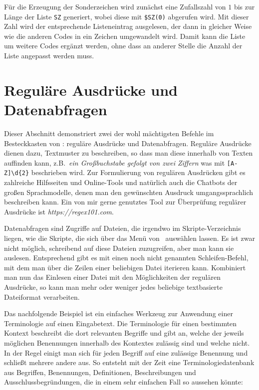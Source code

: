 Für die Erzeugung der Sonderzeichen wird zunächst eine Zufallszahl von $1$ bis zur Länge der Liste \verb|SZ| generiert, wobei diese mit \verb|$SZ(0)| abgerufen wird. Mit dieser Zahl wird der entsprechende Listeneintrag ausgelesen, der dann in gleicher Weise wie die anderen Codes in ein Zeichen umgewandelt wird. Damit kann die Liste um weitere Codes ergänzt werden, ohne dass an anderer Stelle die Anzahl der Liste angepasst werden muss.

\section{Reguläre Ausdrücke und Datenabfragen}\label{RegUndDaten}
Dieser Abschnitt demonstriert zwei der wohl mächtigsten Befehle im Besteckkasten von \FPZ: reguläre Ausdrücke und Datenabfragen. Reguläre Ausdrücke dienen dazu, Textmuster zu beschreiben, so dass man diese innerhalb von Texten auffinden kann, z.B.\ \emph{ein Großbuchstabe gefolgt von zwei Ziffern} was mit \verb|[A-Z]\d{2}| beschrieben wird. Zur Formulierung von regulären Ausdrücken gibt es zahlreiche Hilfsseiten und Online-Tools und natürlich auch die Chatbots der großen Sprachmodelle, denen man den gewünschten Ausdruck umgangssprachlich beschreiben kann. Ein von mir gerne genutztes Tool zur Überprüfung regulärer Ausdrücke ist \emph{https://regex101.com}. 

Datenabfragen sind Zugriffe auf Dateien, die irgendwo im Skripte-Verzeichnis liegen, wie die Skripte, die sich über das Menü von \FPZ\ auswählen lassen. Es ist zwar nicht möglich, schreibend auf diese Dateien zuzugreifen, aber man kann sie auslesen. Entsprechend gibt es mit  einen noch nicht genannten Schleifen-Befehl, mit dem man über die Zeilen einer beliebigen Datei iterieren kann. Kombiniert man nun das Einlesen einer Datei mit den Möglichkeiten der regulären Ausdrücke, so kann man mehr oder weniger jedes beliebige textbasierte Dateiformat verarbeiten. 

Das nachfolgende Beispiel ist ein einfaches Werkzeug zur Anwendung einer Terminologie auf einen Eingabetext. Die Terminologie für einen bestimmten Kontext beschreibt die dort relevanten Begriffe und gibt an, welche der jeweils möglichen Benennungen innerhalb des Kontextes zulässig sind und welche nicht. In der Regel einigt man sich für jeden Begriff auf eine zulässige Benennung und schließt mehrere andere aus. So entsteht mit der Zeit eine Terminologiedatenbank aus Begriffen, Benennungen, Definitionen, Beschreibungen und Ausschlussbegründungen, die in einem sehr einfachen Fall so aussehen könnte:

